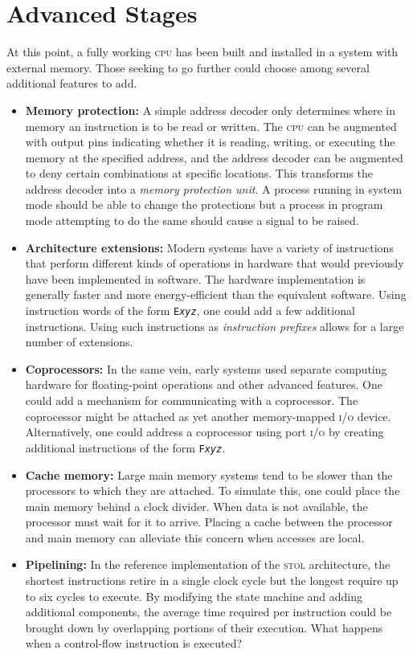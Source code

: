 \documentclass[12pt,english]{book}
\newcommand*{\concept}[2][]{%
  \textit{#2}\ifx#1\empty\empty\index{#2}\else\index{#1}\fi}
\begin{document}
\section{Advanced Stages}
At this point, a fully working \textsc{cpu} has been built
and installed in a system with external memory.
Those seeking to go further could choose among several
additional features to add.
\begin{itemize}
\item \textbf{Memory protection:}
  A simple address decoder only determines where in memory
  an instruction is to be read or written.
  The \textsc{cpu} can be augmented with output pins
  indicating whether it is reading, writing, or executing
  the memory at the specified address,
  and the address decoder can be augmented
  to deny certain combinations at specific locations.
  This transforms the address decoder
  into a \concept{memory protection unit}.
  A process running in system mode
  should be able to change the protections
  but a process in program mode attempting to do the same
  should cause a signal to be raised.
\item \textbf{Architecture extensions:}
  Modern systems have a variety of instructions
  that perform different kinds of operations
  in hardware that would previously
  have been implemented in software.
  The hardware implementation
  is generally faster and more energy-efficient
  than the equivalent software.
  Using instruction words of the form
  \texttt{E\textit{x}\textit{y}\textit{z}},
  one could add a few additional instructions.
  Using such instructions as \concept{instruction prefixes}
  allows for a large number of extensions.
\item \textbf{Coprocessors:}
  In the same vein, early systems used separate computing hardware
  for floating-point operations and other advanced features.
  One could add a mechanism for communicating with a coprocessor.
  The coprocessor might be attached as yet another
  memory-mapped \textsc{i/o} device.
  Alternatively, one could address a coprocessor
  using port \textsc{i/o}
  by creating additional instructions of the form
  \texttt{F\textit{x}\textit{y}\textit{z}}.
\item \textbf{Cache memory:}
  Large main memory systems tend to be slower
  than the processors to which they are attached.
  To simulate this, one could place the main memory
  behind a clock divider.
  When data is not available,
  the processor must wait for it to arrive.
  Placing a cache between the processor and main memory
  can alleviate this concern when accesses are local.
\item \textbf{Pipelining:}
  In the reference implementation of the \textsc{stol} architecture,
  the shortest instructions retire in a single clock cycle
  but the longest require up to six cycles to execute.
  By modifying the state machine and adding additional components,
  the average time required per instruction could be brought down
  by overlapping portions of their execution.
  What happens when a control-flow instruction is executed?
\end{itemize}
\end{document}
